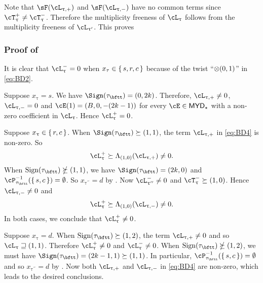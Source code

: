 \documentclass[12pt,a4paper]{amsart}
\def\MYD{{\mathsf{MYD}}}
\numberwithin{equation}{section}
\theoremstyle{remark}
\def\ssign{\mathrm{Sign}}
\def\ncL{\cL^-}
\def\uptaupp{\uptau^{\prime\prime}}
\begin{document}
Note that
$\sF(\ppac{\uptau})$ and $\sF(\nnac{\uptau})$ have no common terms since
$\pcT_{\uptau}\neq \ncT_{\uptau}$. Therefore the multiplicity freeness of
$\ac_{\uptau}$ follows from the multiplicity freeness of $\ac_{\uptau'}$.
This proves 


\subsubsection*{Proof of  }

It is clear that $\nac{\uptau}=0$ when $x_{\tau}\in \set{s,r,c}$ because of
the twist ``$\otimes(0, 1)$'' in \eqref{eq:BD2}.

  \begin{enuma}
    \item Suppose $x_{\uptau}=s$. We have $\Sign(\tau_{\bftt})=(0,2k)$.
    Therefore,  $\ppac{\uptau}\neq 0$, $\nnac{\uptau}=0$ and $\cE(1) =
    (B,0,-(2k-1))$ for every $\cE\in \MYD_{\star}$ with a non-zero coefficient in
    $\ac_{\uptau}$. Hence $\pac{\uptau}=0$.
    \item Suppose $x_{\uptau} \in \set{r,c}$. When
    $\Sign(\tau_{\bftt})\succeq (1,1)$, the term $\ppac{\uptau}$ in \eqref{eq:BD4} is
    non-zero.
    So
    \[
    \pac{\uptau}\succeq \Lambda_{(1,0)} (\ppac{\uptau}) \neq 0.
    \]
    When $\ssign(\tau_{\bftt})\nsucceq (1,1)$,  we have $\Sign(\tau_{\bftt})=(2k,0)$
    and $\cP_{\tau_{\bftt}}^{-1}(\set{s,c})=\emptyset$.
    So $x_{\uptaupp}=d$ by . Now $\ncL_{\uptau''}\neq 0$
    and $\ncT_{\uptau}\succeq (1,0)$.
    Hence  $\nnac{\uptau}\neq 0$ and
    \[
    \pac{\uptau}\succeq \Lambda_{(1,0)} (\nnac{\uptau}) \neq 0.
    \]
    In both cases, we conclude that $\pac{\uptau}\neq 0$.
    \item Suppose $x_{\uptau}=d$. When $\ssign(\tau_{\bftt})\succeq (1,2)$,
    the term $\ppac{\uptau}\neq 0$ and so
    $\ac_{\uptau}\sqsupseteq (1,1)$. Therefore $\pac{\uptau}\neq 0$ and
    $\nac{\uptau}\neq 0$.
    When $\ssign(\tau_{\bftt})\nsucceq(1,2)$, we must have  $\Sign(\tau_{\bftt}) = (2k-1,1)\succeq (1,1)$.
    In particular, $\cP_{\tau_{\bftt}}^{-1}(\set{s,c})=\emptyset$ and
    so $x_{\uptaupp}=d$ by .
    Now both $\ppac{\uptau}$ and $\nnac{\uptau}$ in \eqref{eq:BD4} are non-zero, which leads to the desired conclusions.
  \end{enuma}
\end{document}
